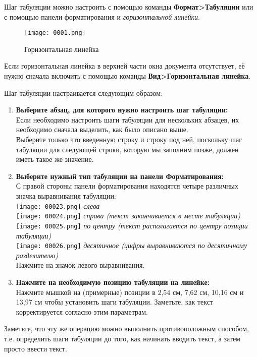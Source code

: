 \documentclass[a4paper,10pt]{article}
\begin{document}
Шаг табуляции можно настроить с помощью команды \textbf{Формат>Табуляции} или с помощью панели форматирования и \textit{горизонтальной линейки}.
\begin{figure}[ht]
\texttt{[image: 0001.png]}
\centering
\caption{Горизонтальная линейка}
\end{figure}

Если горизонтальная линейка в верхней части окна документа отсутствует, её нужно сначала включить с помощью команды \textbf{Вид>Горизонтальная линейка}.

Шаг табуляции настраивается следующим образом:

\begin{enumerate}
 \item \textbf{Выберите абзац, для которого нужно настроить шаг табуляции:}\\
 Если необходимо настроить шаги табуляции для нескольких абзацев, их необходимо сначала выделить, как было описано выше.\\
Выберите только что введенную строку и строку под ней, поскольку шаг табуляции для следующей строки, которую мы заполним позже, должен иметь такое же значение.
\item \textbf{Выберите нужный тип табуляции на панели Форматирования:}\\
С правой стороны панели форматирования находятся четыре различных значка выравнивания табуляции:\\
\texttt{[image: 00023.png]} \textit{слева}\\
\texttt{[image: 00024.png]} \textit{справа (текст заканчивается в месте табуляции)}\\
\texttt{[image: 00025.png]} \textit{по центру (текст располагается по центру позиции табуляции)}\\
\texttt{[image: 00026.png]} \textit{десятичное (цифры выравниваются по десятичному разделителю)}\\
Нажмите на значок левого выравнивания.
\item \textbf{Нажмите на необходимую позицию табуляции на линейке:}\\
Нажмите мышкой на (примерные) позиции в 2,54 см, 7,62 см, 10,16 см и 13,97 см чтобы установить шаги табуляции. Заметьте, как текст корректируется согласно этим параметрам.
\end{enumerate}

Заметьте, что эту же операцию можно выполнить противоположным способом, т.е. определить шаги табуляции до того, как начинать вводить текст, а затем просто ввести текст.
\end{document}
